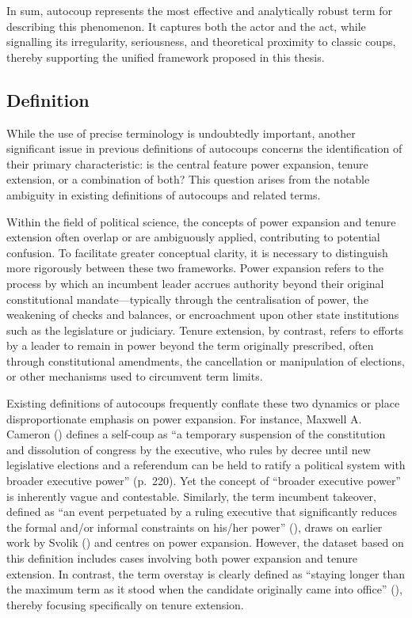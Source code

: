 \documentclass[
  12pt,
]{report}
\begin{document}
In sum, autocoup represents the most effective and analytically robust
term for describing this phenomenon. It captures both the actor and the
act, while signalling its irregularity, seriousness, and theoretical
proximity to classic coups, thereby supporting the unified framework
proposed in this thesis.

\subsection*{Definition}\label{sec-definition}

While the use of precise terminology is undoubtedly important, another
significant issue in previous definitions of autocoups concerns the
identification of their primary characteristic: is the central feature
power expansion, tenure extension, or a combination of both? This
question arises from the notable ambiguity in existing definitions of
autocoups and related terms.

Within the field of political science, the concepts of power expansion
and tenure extension often overlap or are ambiguously applied,
contributing to potential confusion. To facilitate greater conceptual
clarity, it is necessary to distinguish more rigorously between these
two frameworks. Power expansion refers to the process by which an
incumbent leader accrues authority beyond their original constitutional
mandate---typically through the centralisation of power, the weakening
of checks and balances, or encroachment upon other state institutions
such as the legislature or judiciary. Tenure extension, by contrast,
refers to efforts by a leader to remain in power beyond the term
originally prescribed, often through constitutional amendments, the
cancellation or manipulation of elections, or other mechanisms used to
circumvent term limits.

Existing definitions of autocoups frequently conflate these two dynamics
or place disproportionate emphasis on power expansion. For instance,
Maxwell A. Cameron () defines a
self-coup as ``a temporary suspension of the constitution and
dissolution of congress by the executive, who rules by decree until new
legislative elections and a referendum can be held to ratify a political
system with broader executive power'' (p.~220). Yet the concept of
``broader executive power'' is inherently vague and contestable.
Similarly, the term incumbent takeover, defined as ``an event
perpetuated by a ruling executive that significantly reduces the formal
and/or informal constraints on his/her power''
(), draws on
earlier work by Svolik () and centres on
power expansion. However, the dataset based on this definition includes
cases involving both power expansion and tenure extension. In contrast,
the term overstay is clearly defined as ``staying longer than the
maximum term as it stood when the candidate originally came into
office'' (), thereby focusing specifically on tenure extension.
\end{document}
